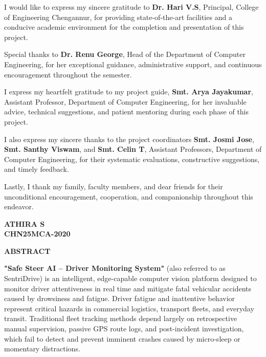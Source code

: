 \documentclass[a4paper,12pt]{report}
\begin{document}
\vspace{0.3cm}
\noindent I would like to express my sincere gratitude to \textbf{Dr. Hari V.S}, Principal, College of Engineering Chengannur, for providing state-of-the-art facilities and a conducive academic environment for the completion and presentation of this project.

\vspace{0.3cm}
\noindent Special thanks to \textbf{Dr. Renu George}, Head of the Department of Computer Engineering, for her exceptional guidance, administrative support, and continuous encouragement throughout the semester.

\vspace{0.3cm}
\noindent I express my heartfelt gratitude to my project guide, \textbf{Smt. Arya Jayakumar}, Assistant Professor, Department of Computer Engineering, for her invaluable advice, technical suggestions, and patient mentoring during each phase of this project.

\vspace{0.3cm}
\noindent I also express my sincere thanks to the project coordinators \textbf{Smt. Josmi Jose}, \textbf{Smt. Santhy Viswam}, and \textbf{Smt. Celin T}, Assistant Professors, Department of Computer Engineering, for their systematic evaluations, constructive suggestions, and timely feedback.

\vspace{0.3cm}
\noindent Lastly, I thank my family, faculty members, and dear friends for their unconditional encouragement, cooperation, and companionship throughout this endeavor.

\vspace{1cm}
\begin{flushright}
  \textbf{ATHIRA S\\CHN25MCA-2020}
\end{flushright}

\clearpage

\begin{center}
    \Large\textbf{ABSTRACT}  
\end{center} 
\vspace{1cm}

\textbf{"Safe Steer AI -- Driver Monitoring System"} (also referred to as SentriDrive) is an intelligent, edge-capable computer vision platform designed to monitor driver attentiveness in real time and mitigate fatal vehicular accidents caused by drowsiness and fatigue. Driver fatigue and inattentive behavior represent critical hazards in commercial logistics, transport fleets, and everyday transit. Traditional fleet tracking methods depend largely on retrospective manual supervision, passive GPS route logs, and post-incident investigation, which fail to detect and prevent imminent crashes caused by micro-sleep or momentary distractions. 
\end{document}
